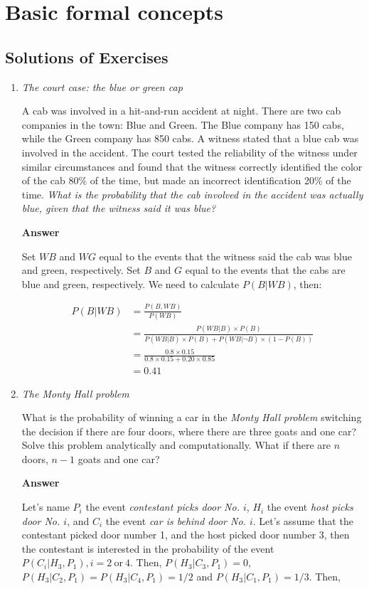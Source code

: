 \chapter{Basic formal concepts}\label{chap1}
\section*{Solutions of Exercises}\label{sec11}
\begin{enumerate}[leftmargin=*]
\item \textit{The court case: the blue or green cap}
	
A cab was involved in a hit-and-run accident at night. There are two cab companies in the town: Blue and Green. The Blue company has 150 cabs, while the Green company has 850 cabs. A witness stated that a blue cab was involved in the accident. The court tested the reliability of the witness under similar circumstances and found that the witness correctly identified the color of the cab 80\% of the time, but made an incorrect identification 20\% of the time. \textit{What is the probability that the cab involved in the accident was actually blue, given that the witness said it was blue?}
	
\textbf{Answer}
	
Set $WB$ and $WG$ equal to the events that the witness said the cab was blue and green, respectively. Set $B$ and $G$ equal to the events that the cabs are blue and green, respectively. We need to calculate $P(B|WB)$, then:
	
\begin{align}
	P(B|WB)&=\frac{P(B,WB)}{P(WB)}\\
	&=\frac{P(WB|B)\times P(B)}{P(WB|B)\times P(B)+P(WB|\lnot B)\times (1-P(B))}\nonumber\\
	&=\frac{0.8\times 0.15}{0.8\times 0.15+0.20\times 0.85}\nonumber\\
	&=0.41\nonumber
\end{align}	
	
\item \textit{The Monty Hall problem}
	
What is the probability of winning a car in the \textit{Monty Hall problem} switching the decision if there are four doors, where there are three goats and one car? Solve this problem analytically and computationally.  What if there are $n$ doors, $n-1$ goats and one car?
	
\textbf{Answer}
	
Let's name $P_i$ the event \textit{contestant picks door No. $i$}, $H_i$ the event \textit{host picks door No. $i$}, and $C_i$ the event \textit{car is behind door No. $i$}. Let's assume that the contestant picked door number 1, and the host picked door number 3, then the contestant is interested in the probability of the event $P(C_i|H_3,P_1), i = 2 \ \text{or} \ 4$. Then, $P(H_3|C_3,P_1)=0$, $P(H_3|C_2,P_1)=P(H_3|C_4,P_1)=1/2$ and $P(H_3|C_1,P_1)=1/3$. Then,  
	

\end{enumerate}
